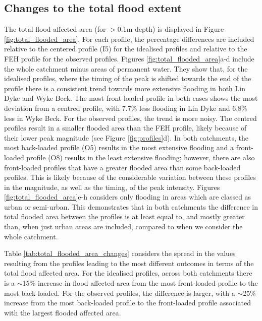 \documentclass[APA,Times2COL]{WileyNJDv5}
\begin{document}
\subsection{Changes to the total flood extent}\label{subsec:model}

The total flood affected area (for $>$0.1m depth) is displayed in Figure \ref{fig:total_flooded_area}. For each profile, the percentage differences are included relative to the centered profile (I5) for the idealised profiles and relative to the FEH profile for the observed profiles. Figures  \ref{fig:total_flooded_area}a-d include the whole catchment minus areas of permanent water. They show that, for the idealised profiles, where the timing of the peak is shifted towards the end of the profile there is a consistent trend towards more extensive flooding in both Lin Dyke and Wyke Beck. The most front-loaded profile in both cases shows the most deviation from a centred profile, with 7.7\% less flooding in Lin Dyke and 6.8\% less in Wyke Beck. For the observed profiles, the trend is more noisy. The centred profiles result in a smaller flooded area than the FEH profile, likely because of their lower peak magnitude (see Figure \ref{fig:profiles}d). In both catchments, the most back-loaded profile (O5) results in the most extensive flooding and a front-loaded profile (O8) results in the least extensive flooding; however, there are also front-loaded profiles that have a greater flooded area than some back-loaded profiles. This is likely because of the considerable variation between these profiles in the magnitude, as well as the timing, of the peak intensity. Figures \ref{fig:total_flooded_area}e-h considers only flooding in areas which are classed as urban or semi-urban. This demonstrates that in both catchments the difference in total flooded area between the profiles is at least equal to, and mostly greater than, when just urban areas are included, compared to when we consider the whole catchment. 

Table \ref{tab:total_flooded_area_changes} considers the spread in the values resulting from the profiles leading to the most different outcomes in terms of the total flood affected area. For the idealised profiles, across both catchments there is a $\sim$15\% increase in flood affected area from the most front-loaded profile to the most back-loaded. For the observed profiles, the difference is larger, with a $\sim$25\% increase from the most back-loaded profile to the front-loaded profile associated with the largest flooded affected area.  
\end{document}
